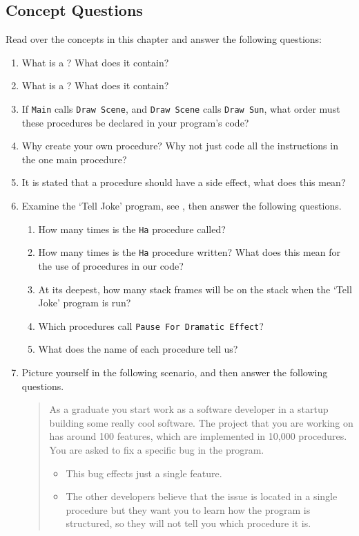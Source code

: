 \subsection{Concept Questions} %
\label{sub:concept_questions_proc}

Read over the concepts in this chapter and answer the following questions:
\begin{enumerate}
  \item What is a ? What does it contain?
  \item What is a ? What does it contain?
  \item If \texttt{Main} calls \texttt{Draw Scene}, and \texttt{Draw Scene} calls \texttt{Draw Sun}, what order must these procedures be declared in your program's code?
  \item Why create your own procedure? Why not just code all the instructions in the one main procedure?
  \item It is stated that a procedure should have a side effect, what does this mean?
  \item Examine the `Tell Joke' program, see , then answer the following questions.
  \begin{enumerate}
    \item How many times is the \texttt{Ha} procedure called?
    \item How many times is the \texttt{Ha} procedure written? What does this mean for the use of procedures in our code?
    \item At its deepest, how many stack frames will be on the stack when the `Tell Joke' program is run?
    \item Which procedures call \texttt{Pause For Dramatic Effect}?
    \item What does the name of each procedure tell us?
  \end{enumerate}
  \item Picture yourself in the following scenario, and then answer the following questions.
  \begin{quote}
    As a graduate you start work as a software developer in a startup building some really cool software. The project that you are working on has around 100 features, which are implemented in 10,000 procedures. You are asked to fix a specific bug in the program. 
    \begin{itemize}
      \item This bug effects just a single feature. 
      \item The other developers believe that the issue is located in a single procedure but they want you to learn how the program is structured, so they will not tell you which procedure it is. 

\end{itemize}
\end{quote}
\end{enumerate}
